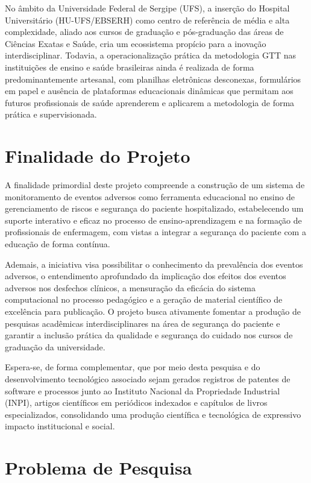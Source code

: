 No âmbito da Universidade Federal de Sergipe (UFS), a inserção do Hospital Universitário (HU-UFS/EBSERH) como centro de referência de média e alta complexidade, aliado aos cursos de graduação e pós-graduação das áreas de Ciências Exatas e Saúde, cria um ecossistema propício para a inovação interdisciplinar. Todavia, a operacionalização prática da metodologia GTT nas instituições de ensino e saúde brasileiras ainda é realizada de forma predominantemente artesanal, com planilhas eletrônicas desconexas, formulários em papel e ausência de plataformas educacionais dinâmicas que permitam aos futuros profissionais de saúde aprenderem e aplicarem a metodologia de forma prática e supervisionada.

\section{Finalidade do Projeto}
\label{sec:finalidade}

A finalidade primordial deste projeto compreende a construção de um sistema de monitoramento de eventos adversos como ferramenta educacional no ensino de gerenciamento de riscos e segurança do paciente hospitalizado, estabelecendo um suporte interativo e eficaz no processo de ensino-aprendizagem e na formação de profissionais de enfermagem, com vistas a integrar a segurança do paciente com a educação de forma contínua. 

Ademais, a iniciativa visa possibilitar o conhecimento da prevalência dos eventos adversos, o entendimento aprofundado da implicação dos efeitos dos eventos adversos nos desfechos clínicos, a mensuração da eficácia do sistema computacional no processo pedagógico e a geração de material científico de excelência para publicação. O projeto busca ativamente fomentar a produção de pesquisas acadêmicas interdisciplinares na área de segurança do paciente e garantir a inclusão prática da qualidade e segurança do cuidado nos cursos de graduação da universidade. 

Espera-se, de forma complementar, que por meio desta pesquisa e do desenvolvimento tecnológico associado sejam gerados registros de patentes de software e processos junto ao Instituto Nacional da Propriedade Industrial (INPI), artigos científicos em periódicos indexados e capítulos de livros especializados, consolidando uma produção científica e tecnológica de expressivo impacto institucional e social.

\section{Problema de Pesquisa}
\label{sec:problema}

